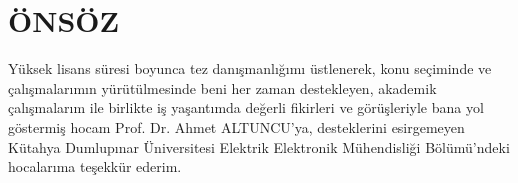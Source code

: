 \chapter*{ÖNSÖZ}



Yüksek lisans süresi boyunca tez danışmanlığımı üstlenerek, konu seçiminde ve çalışmalarımın yürütülmesinde beni her zaman destekleyen, akademik çalışmalarım ile birlikte iş yaşantımda değerli fikirleri ve görüşleriyle bana yol göstermiş hocam Prof. Dr. Ahmet ALTUNCU’ya, desteklerini esirgemeyen Kütahya Dumlupınar Üniversitesi Elektrik Elektronik Mühendisliği Bölümü’ndeki hocalarıma teşekkür ederim.